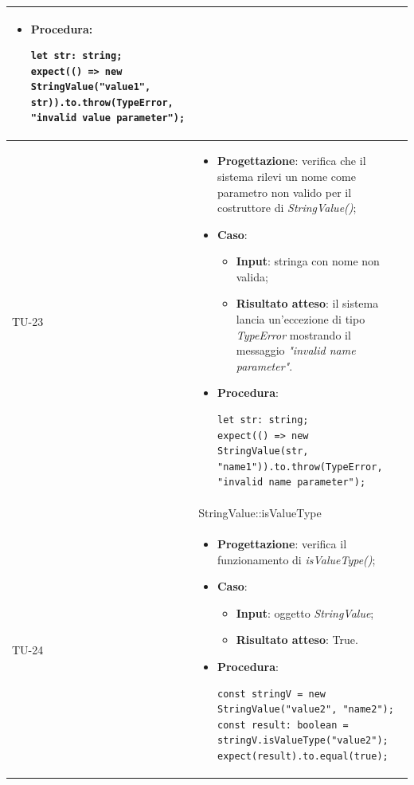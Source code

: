\begin{longtable}{|C{1.5cm}|C{14.5cm}|}
\begin{itemize}
\begin{itemize}
		\end{itemize}
		\item \textbf{Procedura}:
		\begin{lstlisting}
let str: string;
expect(() => new StringValue("value1", str)).to.throw(TypeError, "invalid value parameter");		
		\end{lstlisting}
	\end{itemize}\\
	\hline	
	{TU-23} &  
	\begin{itemize}
		\item \textbf{Progettazione}: verifica che il sistema rilevi un nome come parametro non valido per il costruttore di \emph{StringValue()};
		\item \textbf{Caso}: 
		\begin{itemize}
			\item \textbf{Input}: stringa con nome non valida;
			\item \textbf{Risultato atteso}: il sistema lancia un'eccezione di tipo \emph{TypeError} mostrando il messaggio \emph{"invalid name parameter"}.
		\end{itemize}
		\item \textbf{Procedura}:
		\begin{lstlisting}
let str: string;
expect(() => new StringValue(str, "name1")).to.throw(TypeError, "invalid name parameter");		
		\end{lstlisting}
	\end{itemize}\\
	\hline
	 & StringValue::isValueType\\
	\hline
	{TU-24} &  
	\begin{itemize}
		\item \textbf{Progettazione}: verifica il funzionamento di \emph{isValueType()};
		\item \textbf{Caso}: 
		\begin{itemize}
			\item \textbf{Input}: oggetto \emph{StringValue};
			\item \textbf{Risultato atteso}: True.
		\end{itemize}
		\item \textbf{Procedura}:
		\begin{lstlisting}
const stringV = new StringValue("value2", "name2");
const result: boolean = stringV.isValueType("value2");
expect(result).to.equal(true);
		\end{lstlisting}
	\end{itemize}\\

\end{longtable}
